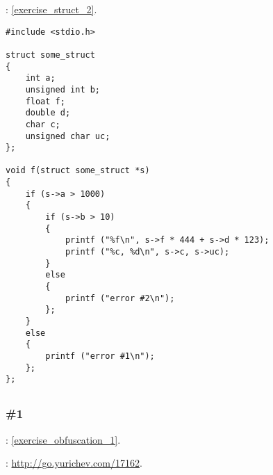 \Exercise: \ref{exercise_struct_2}.


\begin{lstlisting}
#include <stdio.h>

struct some_struct
{
	int a;
	unsigned int b;
	float f;
	double d;
	char c;
	unsigned char uc;
};

void f(struct some_struct *s)
{
	if (s->a > 1000)
	{
		if (s->b > 10)
		{
			printf ("%f\n", s->f * 444 + s->d * 123);
			printf ("%c, %d\n", s->c, s->uc);
		}
		else
		{
			printf ("error #2\n");
		};
	}
	else
	{
		printf ("error #1\n");
	};
};
\end{lstlisting}

\subsection{}

\subsubsection{\Exercise \#1}
\label{exercise_solutions_obfuscation_1}

\Exercise: \ref{exercise_obfuscation_1}.

: \url{http://go.yurichev.com/17162}.
